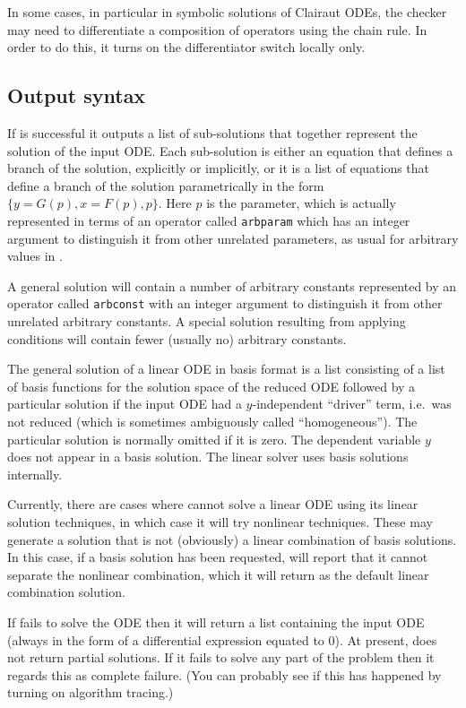 In some cases, in particular in symbolic solutions of Clairaut ODEs,
the checker may need to differentiate a composition of operators using
the chain rule.  In order to do this, it turns on the differentiator
switch  locally only.


\subsection{Output syntax}

If  is successful it outputs a list of sub-solutions that
together represent the solution of the input ODE\@.  Each sub-solution
is either an equation that defines a branch of the solution,
explicitly or implicitly, or it is a list of equations that define a
branch of the solution parametrically in the form $\{y = G(p), x =
F(p), p\}$.  Here $p$ is the parameter, which is actually represented
in terms of an operator called \texttt{arbparam} which has an integer
argument to distinguish it from other unrelated parameters, as usual
for arbitrary values in \REDUCE{}.

A general solution will contain a number of arbitrary constants
represented by an operator called \texttt{arbconst} with an integer
argument to distinguish it from other unrelated arbitrary constants.
A special solution resulting from applying conditions will contain
fewer (usually no) arbitrary constants.

The general solution of a linear ODE in basis format is a list
consisting of a list of basis functions for the solution space of the
reduced ODE followed by a particular solution if the input ODE had a
$y$-independent ``driver'' term, i.e.\ was not reduced (which is
sometimes ambiguously called ``homogeneous'').  The particular
solution is normally omitted if it is zero.  The dependent variable
$y$ does not appear in a basis solution.  The linear solver uses basis
solutions internally.

Currently, there are cases where  cannot solve a linear ODE
using its linear solution techniques, in which case it will try
nonlinear techniques.  These may generate a solution that is not
(obviously) a linear combination of basis solutions.  In this case, if
a basis solution has been requested,  will report that it
cannot separate the nonlinear combination, which it will return as the
default linear combination solution.

If  fails to solve the ODE then it will return a list
containing the input ODE (always in the form of a differential
expression equated to 0).  At present,  does not return
partial solutions.  If it fails to solve any part of the problem then
it regards this as complete failure.  (You can probably see if this
has happened by turning on algorithm tracing.)


